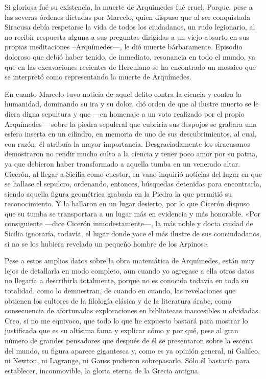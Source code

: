 \documentclass[a4paper, 12pt, draft]{article}
\begin{document}
{%

Si gloriosa fué su existencia, la muerte de Arquimedes fué cruel. Porque, pese a las severas órdenes dictadas por Marcelo, quien dispuso que al ser conquistada Siracusa debía respetarse la vida de todos los ciudadanos, un rudo legionario, al no recibir respuesta alguna a sus preguntas dirigidas a un viejo absorto en sus propias meditaciones --Arquímedes---, le dió muerte bárbaramente. Episodio doloroso que debió haber tenido, de inmediato, resonancia en todo el mundo, ya que en las excavaciones recientes de Herculano se ha encontrado un mosaico que se interpretó como representando la muerte de Arquímedes.


En cuanto  Marcelo tuvo noticia de aquel delito contra la ciencia y contra la humanidad, dominando su ira y su dolor, dió orden de que al ilustre muerto se le diera digna sepultura y que ---en homenaje a un voto realizado por el propio Arquímedes--- sobre la piedra sepulcral que cubriría sus despojos se grabara una esfera inserta en un cilindro, en memoria de uno de sus descubrimientos, al cual, con razón, él atribuía la mayor importancia. Desgraciadamente los siracusanos demostraron no rendir mucho culto a la ciencia y tener poco amor por su patria, ya que debieron haber transformado a aquella tumba en un venerado altar. Cicerón, al llegar a Sicilia como cuestor, en vano inquirió noticias del lugar en que se hallase el sepulcro, ordenando, entonces, búsquedas detenidas para encontrarla, siendo aquella figura geométrica grabada en la Piedra la que permitió su reconocimiento. Y la hallaron en un lugar desierto, por lo que Cicerón dispuso que su tumba se transportara a un lugar más en evidencia y más honorable. «Por consiguiente ---dice Cicerón inmodestamente---, la más noble y docta ciudad de Sicilia ignoraría, todavía, el lugar donde yace el más ilustre de sus conciudadanos, si no se los hubiera revelado un pequeño hombre de los Arpinos».





Pese a estos amplios datos sobre la obra matemática de Arquímedes, están muy lejos de detallarla en modo completo, aun cuando yo agregase a ella otros datos no llegaría a describirla totalmente, porque no es conocida todavía en toda su totalidad, como lo demuestran, de cuando en cuando, las revelaciones que obtienen los cultores de la filología clásica y de la literatura árabe, como consecuencia de afortunadas exploraciones en bibliotecas inaccesibles u olvidadas. Creo, si no me equivoco, que todo lo que he expuesto bastará para mostrar lo justificada que es su altísima fama y explicar cómo y por qué, pese al gran número de grandes pensadores que después de él se presentaron sobre la escena del mundo, su figura aparece gigantesca y, como es ya opinión general, ni Galileo, ni Newton, ni Lagrange, ni Gauss pudieron sobrepasarlo. Sólo él bastaría para establecer, inconmovible, la gloria eterna de la Grecia antigua.

}
\end{document}

